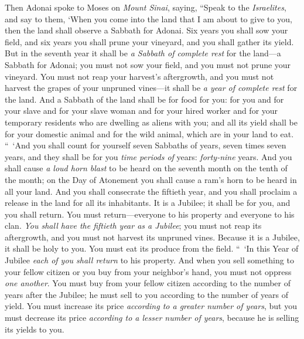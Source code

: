 \begin{biblechapter} %
 Then Adonai spoke to Moses on \textit{Mount Sinai}, saying,
\verse “Speak to the \textit{Israelites}, and say to them, ‘When you come into the land that I am about to give to you, then the land shall observe a Sabbath for Adonai.
\verse Six years you shall sow your field, and six years you shall prune your vineyard, and you shall gather its yield.
\verse But in the seventh year it shall be \textit{a Sabbath of complete rest} for the land—a Sabbath for Adonai; you must not sow your field, and you must not prune your vineyard.
\verse You must not reap your harvest’s aftergrowth, and you must not harvest the grapes of your unpruned vines—it shall be \textit{a year of complete rest} for the land.
\verse And a Sabbath of the land shall be for food for you: for you and for your slave and for your slave woman and for your hired worker and for your temporary residents who are dwelling as aliens with you;
\verse and all its yield shall be for your domestic animal and for the wild animal, which are in your land to eat.
 “ ‘And you shall count for yourself seven Sabbaths of years, seven times seven years, and they shall be for you \textit{time periods of} years: \textit{forty-nine} years.
\verse And you shall cause \textit{a loud horn blast} to be heard on the seventh month on the tenth of the month; on the Day of Atonement you shall cause a ram’s horn to be heard in all your land.
\verse And you shall consecrate the fiftieth year, and you shall proclaim a release in the land for all its inhabitants. It is a Jubilee; it shall be for you, and you shall return. You must return—everyone to his property and everyone to his clan.
\verse \textit{You shall have the fiftieth year as a Jubilee}; you must not reap its aftergrowth, and you must not harvest its unpruned vines.
\verse Because it is a Jubilee, it shall be holy to you. You must eat its produce from the field.
\verse “ ‘In this Year of Jubilee \textit{each of you shall return} to his property.
\verse And when you sell something to your fellow citizen or you buy from your neighbor’s hand, you must not oppress \textit{one another}.
\verse You must buy from your fellow citizen according to the number of years after the Jubilee; he must sell to you according to the number of years of yield.
\verse You must increase its price \textit{according to a greater number of years}, but you must decrease its price \textit{according to a lesser number of years}, because he is selling its yields to you.

\end{biblechapter}
